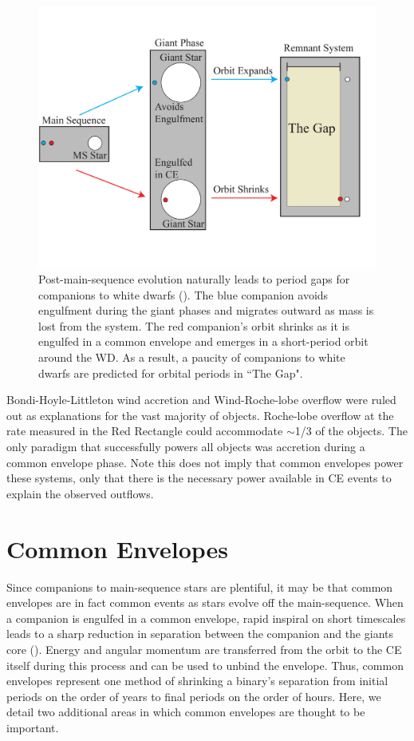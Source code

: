 \documentclass{iau_FM}
\begin{document}
\begin{figure}[b]
\begin{center}
 \includegraphics[width=5in]{GapFigure.pdf} 
 \caption{Post-main-sequence evolution naturally leads to period gaps for companions to white dwarfs (\cite{NS2013}).  The blue companion avoids engulfment during the giant phases and migrates outward as mass is lost from the system.  The red companion's orbit shrinks as it is engulfed in a common envelope and emerges in a short-period orbit around the WD.  As a result, a paucity of companions to white dwarfs are predicted for orbital periods in ``The Gap".}
   \label{fig1}
\end{center}
\end{figure}

Bondi-Hoyle-Littleton wind accretion and Wind-Roche-lobe overflow were ruled out as explanations for the vast majority of objects.  Roche-lobe overflow at the rate measured in the Red Rectangle could accommodate $\sim$1/3 of the objects.  The only paradigm that successfully powers all objects was accretion during a common envelope phase.  Note this does not imply that common envelopes power these systems, only that there is the necessary power available in CE events to explain the observed outflows.


\section{Common Envelopes}

Since companions to main-sequence stars are plentiful, it may be that common envelopes are in fact common events as stars evolve off the main-sequence.  When a companion is engulfed in a common envelope, rapid inspiral on short timescales leads to a sharp reduction in separation between the companion and the giants core (\cite{1976IAUS...73...75P}).  Energy and angular momentum are transferred from the orbit to the CE itself during this process and can be used to unbind the envelope.  Thus, common envelopes represent one method of shrinking a binary's separation from initial periods on the order of years to final periods on the order of hours.  Here, we detail two additional areas in which common envelopes are thought to be important.
\end{document}

